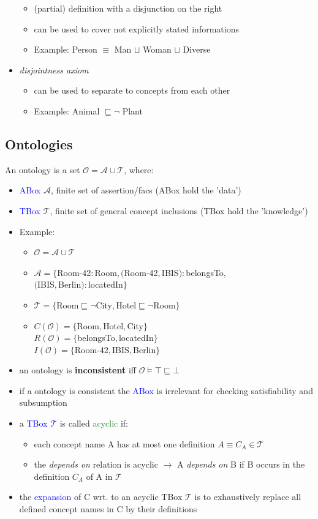 \documentclass[12pt,a4paper]{article}
\newcommand{\blue}[1]{\textcolor{blue} {#1}}
\newcommand{\green}[1]{\textcolor{ForestGreen} {#1}}
\newcommand{\ra}{$\rightarrow$ }
\newcommand{\sse}{\sqsubseteq}
\newcommand{\sor}{\sqcup}
\begin{document}
\begin{itemize}
\begin{itemize}
\item (partial) definition with a disjunction on the right
\item can be used to cover not explicitly stated informations
\item Example: Person $\equiv$ Man $\sor$ Woman $\sor$ Diverse
\end{itemize}
\item \textit{disjointness axiom}
\begin{itemize}
\item can be used to separate to concepts from each other
\item Example: Animal $\sse\neg$ Plant
\end{itemize}
\end{itemize}

\subsection{Ontologies}
An ontology is a set $\mathcal{O = A\cup T}$, where:
\begin{itemize}
\item \blue{ABox} $\mathcal{A}$, finite set of assertion/facs (ABox hold the 'data')
\item \blue{TBox} $\mathcal{T}$, finite set of general concept inclusions (TBox hold the 'knowledge')
\item Example:\begin{itemize}
\item $\mathcal{O=A\cup T}$
\item $\mathcal{A} = \{$Room-42$:$Room$,($Room-42$,$IBIS$):$belongsTo$,$\\$($IBIS$, $Berlin$):$locatedIn$\}$
\item $\mathcal{T} = \{$Room$ \sse \neg $City$, $Hotel$ \sse \neg $Room$\}$
\item $C(\mathcal{O}) = \{$Room$, $Hotel$, $City$\}$\\$R(\mathcal{O}) = \{$belongsTo$, $locatedIn$\}$\\$I(\mathcal{O}) = \{$Room-42$, $IBIS$, $Berlin$\}$
\end{itemize}
\item an ontology is \textbf{inconsistent} iff $\mathcal{O} \models \top \sse \bot$
\item if a ontology is consistent the \blue{ABox} is irrelevant for checking satisfiability and subsumption
\item a \blue{TBox $\mathcal{T}$} is called \green{acyclic} if:
\begin{itemize}
\item each concept name A has at most one definition $A \equiv C_A \in\mathcal{T}$
\item the \textit{depends on} relation is acyclic \ra A \textit{depends on} B if B occurs in the definition $C_A$ of A in $\mathcal{T}$
\end{itemize}
\item the \blue{expansion} of C wrt. to an acyclic TBox $\mathcal{T}$ is to exhaustively replace all defined concept names in C by their definitions
\end{itemize}
\end{document}
